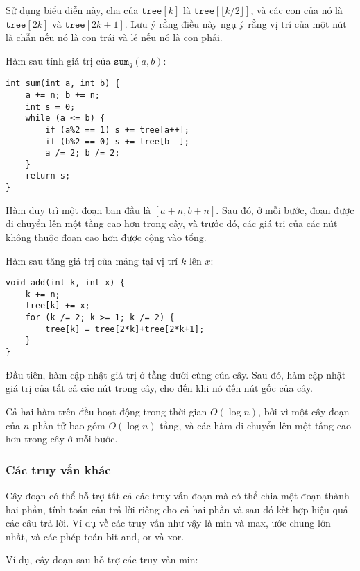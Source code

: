 Sử dụng biểu diễn này,
cha của $\texttt{tree}[k]$
là $\texttt{tree}[\lfloor k/2 \rfloor]$,
và các con của nó là $\texttt{tree}[2k]$
và $\texttt{tree}[2k+1]$.
Lưu ý rằng điều này ngụ ý rằng vị trí của một nút
là chẵn nếu nó là con trái và lẻ nếu nó là con phải.

Hàm sau
tính giá trị của $\texttt{sum}_q(a,b)$:
\begin{lstlisting}
int sum(int a, int b) {
    a += n; b += n;
    int s = 0;
    while (a <= b) {
        if (a%2 == 1) s += tree[a++];
        if (b%2 == 0) s += tree[b--];
        a /= 2; b /= 2;
    }
    return s;
}
\end{lstlisting}
Hàm duy trì một đoạn
ban đầu là $[a+n,b+n]$.
Sau đó, ở mỗi bước, đoạn được di chuyển
lên một tầng cao hơn trong cây,
và trước đó, các giá trị của các nút không
thuộc đoạn cao hơn được cộng vào tổng.

Hàm sau tăng giá trị của mảng
tại vị trí $k$ lên $x$:
\begin{lstlisting}
void add(int k, int x) {
    k += n;
    tree[k] += x;
    for (k /= 2; k >= 1; k /= 2) {
        tree[k] = tree[2*k]+tree[2*k+1];
    }
}
\end{lstlisting}
Đầu tiên, hàm cập nhật giá trị
ở tầng dưới cùng của cây.
Sau đó, hàm cập nhật giá trị của tất cả
các nút trong cây, cho đến khi nó đến
nút gốc của cây.

Cả hai hàm trên đều hoạt động
trong thời gian $O(\log n)$, bởi vì một cây đoạn
của $n$ phần tử bao gồm $O(\log n)$ tầng,
và các hàm di chuyển lên một tầng cao hơn
trong cây ở mỗi bước.

\subsubsection{Các truy vấn khác}

Cây đoạn có thể hỗ trợ tất cả các truy vấn đoạn
mà có thể chia một đoạn thành hai phần,
tính toán câu trả lời riêng cho cả hai phần
và sau đó kết hợp hiệu quả các câu trả lời.
Ví dụ về các truy vấn như vậy là
min và max, ước chung lớn nhất,
và các phép toán bit and, or và xor.

Ví dụ, cây đoạn sau
hỗ trợ các truy vấn min:


